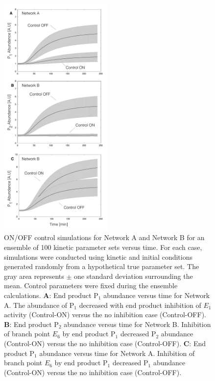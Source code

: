 \documentclass[12pt]{article}
\begin{document}
\begin{figure}
\centering
\includegraphics[width=0.50\textwidth]{./figs/Figure-4-OnOffSimulations.pdf}
\caption{ON/OFF control simulations for Network A and Network B for an ensemble of 100 kinetic parameter sets versus time. 
For each case, simulations were conducted using kinetic and initial conditions generated randomly from a hypothetical true parameter set. 
The gray area represents $\pm$ one standard deviation surrounding the mean. 
Control parameters were fixed during the ensemble calculations.
\textbf{A}: End product P$_{1}$ abundance versus time for Network A. 
The abundance of P$_{1}$ decreased with end product inhibition of $E_{1}$ activity (Control-ON) versus the no inhibition case (Control-OFF). 
\textbf{B}: End product P$_{2}$ abundance versus time for Network B. Inhibition of branch point $E_{6}$ by end product P$_{1}$ decreased P$_{2}$ abundance (Control-ON) versus the
no inhibition case (Control-OFF).
\textbf{C}: End product P$_{1}$ abundance versus time for Network A. 
Inhibition of branch point $E_{6}$ by end product P$_{1}$ decreased P$_{1}$ abundance (Control-ON) versus the no inhibition case (Control-OFF).
}\label{fig-onoff-simulations}
\end{figure}
\end{document}

